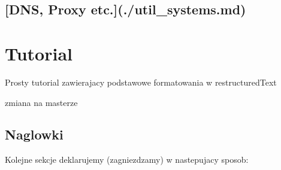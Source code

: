 \documentclass[letterpaper,10pt,english]{sphinxmanual}
\begin{document}
\section{{[}DNS, Proxy etc.{]}(./util\_systems.md)}
\label{\detokenize{basics/README:dns-proxy-etc-util-systems-md}}

\chapter{Tutorial}
\label{\detokenize{tutorial::doc}}\label{\detokenize{tutorial:tutorial}}
Prosty tutorial zawierajacy podstawowe formatowania w restructuredText


zmiana na masterze


\section{Naglowki}
\label{\detokenize{tutorial:naglowki}}
Kolejne sekcje deklarujemy (zagniezdzamy) w nastepujacy sposob:

\begin{sphinxVerbatim}[commandchars=\\\{\}]
   
        
        
     

  

  

  
\end{sphinxVerbatim}
\end{document}
